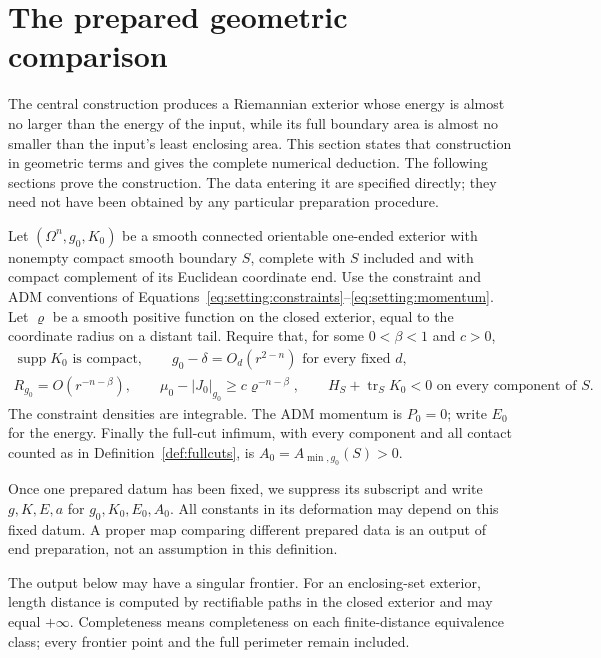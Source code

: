 \section{The prepared geometric comparison}
\label{sec:comparison}

The central construction produces a Riemannian exterior whose energy is
almost no larger than the energy of the input, while its full boundary
area is almost no smaller than the input's least enclosing area. This
section states that construction in geometric terms and gives the complete
numerical deduction. The following sections prove the construction. The
data entering it are specified directly; they need not have been obtained
by any particular preparation procedure.

\begin{definition}\label{def:prepared}
Let $(\Omega^n,g_0,K_0)$ be a smooth connected orientable one-ended
exterior with nonempty compact smooth boundary $S$, complete with $S$
included and with compact complement of its Euclidean coordinate end.
Use the constraint and ADM conventions of
Equations~\eqref{eq:setting:constraints}--\eqref{eq:setting:momentum}. Let $\varrho$ be a
smooth positive function on the closed exterior, equal to the coordinate
radius on a distant tail. Require that, for some $0<\beta<1$ and $c>0$,
\begin{equation}\label{eq:end:prepared}
\begin{gathered}
 \operatorname{supp}K_0\text{ is compact},\qquad
 g_0-\delta=O_d(r^{2-n})\text{ for every fixed }d,\\
 R_{g_0}=O(r^{-n-\beta}),\qquad
 \mu_0-|J_0|_{g_0}\ge c\varrho^{-n-\beta},\qquad
 H_S+\operatorname{tr}_S K_0<0\text{ on every component of }S.
\end{gathered}
\end{equation}
The constraint densities are integrable. The ADM momentum is $P_0=0$;
write $E_0$ for the energy. Finally the full-cut infimum, with every
component and all contact counted as in Definition~\ref{def:fullcuts}, is
$A_0=A_{\min,g_0}(S)>0$.
\end{definition}

Once one prepared datum has been fixed, we suppress its subscript and
write $g,K,E,a$ for $g_0,K_0,E_0,A_0$. All constants in its deformation
may depend on this fixed datum. A proper map comparing different prepared
data is an output of end preparation, not an assumption in this definition.

The output below may have a singular frontier. For an enclosing-set
exterior, length distance is computed by
rectifiable paths in the closed exterior and may equal $+\infty$.
Completeness means completeness on each finite-distance equivalence
class; every frontier point and the full perimeter remain included.

